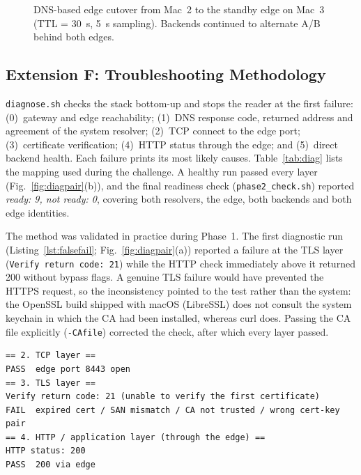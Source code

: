 \documentclass[conference,a4paper]{IEEEtran}
\newcommand{\code}[1]{\texttt{#1}}
\begin{document}
\begin{figure}[t]
\centering
{}
\caption{DNS-based edge cutover from Mac~2 to the standby edge on Mac~3 (TTL = 30~s, 5~s
sampling). Backends continued to alternate A/B behind both edges.}
\label{fig:cut}
\end{figure}

\subsection{Extension F: Troubleshooting Methodology}
\code{diagnose.sh} checks the stack bottom-up and stops the reader at the first failure:
(0)~gateway and edge reachability; (1)~DNS response code, returned address and agreement of the
system resolver; (2)~TCP connect to the edge port; (3)~certificate verification; (4)~HTTP status
through the edge; and (5)~direct backend health. Each failure prints its most likely causes.
Table~\ref{tab:diag} lists the mapping used during the challenge. A healthy run passed every
layer (Fig.~\ref{fig:diagpair}(b)), and the final readiness check (\code{phase2\_check.sh}) reported
\emph{ready: 9, not ready: 0}, covering both resolvers, the edge, both backends and both edge
identities.

The method was validated in practice during Phase~1. The first diagnostic run
(Listing~\ref{lst:falsefail}; Fig.~\ref{fig:diagpair}(a)) reported a failure at the TLS layer
(\code{Verify return code: 21}) while the HTTP check immediately above it returned 200 without
bypass flags. A genuine TLS failure would have prevented the HTTPS request, so the inconsistency
pointed to the test rather than the system: the OpenSSL build shipped with macOS (LibreSSL) does
not consult the system keychain in which the CA had been installed, whereas curl does. Passing the
CA file explicitly (\code{-CAfile}) corrected the check, after which every layer passed.
\begin{lstlisting}[caption={First diagnostic run (excerpt): inconsistent layers},label={lst:falsefail}]
== 2. TCP layer ==
PASS  edge port 8443 open
== 3. TLS layer ==
Verify return code: 21 (unable to verify the first certificate)
FAIL  expired cert / SAN mismatch / CA not trusted / wrong cert-key pair
== 4. HTTP / application layer (through the edge) ==
HTTP status: 200
PASS  200 via edge
\end{lstlisting}
\end{document}
